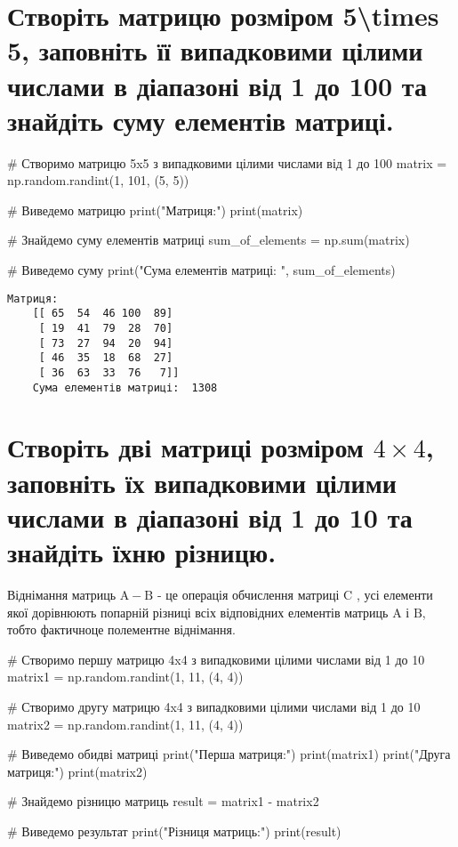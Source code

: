 \documentclass[]{article}
\newcounter{pythoncode}
\begin{document}
\section{Створіть матрицю розміром 5\textbackslash times 5, заповніть її випадковими цілими числами в діапазоні від 1 до 100 та знайдіть суму елементів матриці.}

\begin{pythoncode}
    # Створимо матрицю 5x5 з випадковими цілими числами від 1 до 100
    matrix = np.random.randint(1, 101, (5, 5))

    # Виведемо матрицю
    print("Матриця:")
    print(matrix)

    # Знайдемо суму елементів матриці
    sum_of_elements = np.sum(matrix)

    # Виведемо суму
    print("Сума елементів матриці: ", sum_of_elements)
\end{pythoncode}

\begin{Verbatim}[commandchars=\\\{\}]
	Матриця:
	[[ 65  54  46 100  89]
	 [ 19  41  79  28  70]
	 [ 73  27  94  20  94]
	 [ 46  35  18  68  27]
	 [ 36  63  33  76   7]]
	Сума елементів матриці:  1308
\end{Verbatim}

\section{\texorpdfstring{Створіть дві матриці розміром
		\(4\times 4\), заповніть їх випадковими цілими числами в діапазоні від 1
		до 10 та знайдіть їхню
		різницю.}{Створіть дві матриці розміром 4\textbackslash times 4, заповніть їх випадковими цілими числами в діапазоні від 1 до 10 та знайдіть їхню різницю.}}

Віднімання матриць \(\mathrm A - \mathrm B\) - це операція обчислення
матриці \(\mathrm C\) , усі елементи якої дорівнюють попарній різниці
всіх відповідних елементів матриць \(\mathrm A\) і \(\mathrm B\), тобто
фактичноце полементне віднімання.

\begin{pythoncode}
    # Створимо першу матрицю 4x4 з випадковими цілими числами від 1 до 10
    matrix1 = np.random.randint(1, 11, (4, 4))

    # Створимо другу матрицю 4x4 з випадковими цілими числами від 1 до 10
    matrix2 = np.random.randint(1, 11, (4, 4))

    # Виведемо обидві матриці
    print("Перша матриця:")
    print(matrix1)
    print("Друга матриця:")
    print(matrix2)

    # Знайдемо різницю матриць
    result = matrix1 - matrix2

    # Виведемо результат
    print("Різниця матриць:")
    print(result)
\end{pythoncode}
\end{document}
